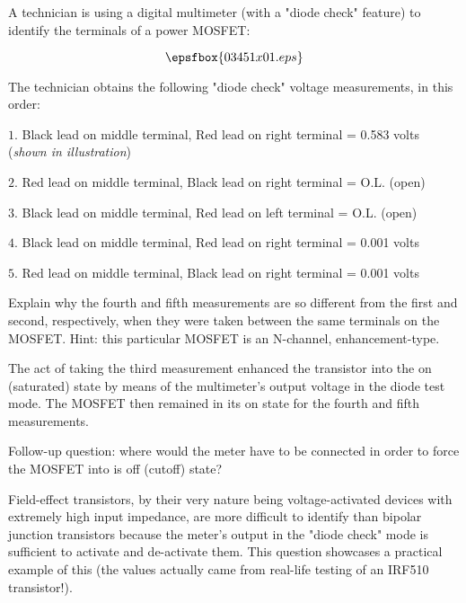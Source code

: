 

A technician is using a digital multimeter (with a "diode check" feature) to identify the terminals of a power MOSFET:

$$\epsfbox{03451x01.eps}$$

\goodbreak
The technician obtains the following "diode check" voltage measurements, in this order:

\medskip
\item{$1.$} Black lead on middle terminal, Red lead on right terminal = 0.583 volts ({\it shown in illustration})
\item{$2.$} Red lead on middle terminal, Black lead on right terminal = O.L. (open)
\item{$3.$} Black lead on middle terminal, Red lead on left terminal = O.L. (open)
\item{$4.$} Black lead on middle terminal, Red lead on right terminal = 0.001 volts
\item{$5.$} Red lead on middle terminal, Black lead on right terminal = 0.001 volts
\medskip

Explain why the fourth and fifth measurements are so different from the first and second, respectively, when they were taken between the same terminals on the MOSFET.  Hint: this particular MOSFET is an N-channel, enhancement-type.







The act of taking the third measurement enhanced the transistor into the on (saturated) state by means of the multimeter's output voltage in the diode test mode.  The MOSFET then remained in its on state for the fourth and fifth measurements.

\vskip 10pt

Follow-up question: where would the meter have to be connected in order to force the MOSFET into is off (cutoff) state?







Field-effect transistors, by their very nature being voltage-activated devices with extremely high input impedance, are more difficult to identify than bipolar junction transistors because the meter's output in the "diode check" mode is sufficient to activate and de-activate them.  This question showcases a practical example of this (the values actually came from real-life testing of an IRF510 transistor!).




